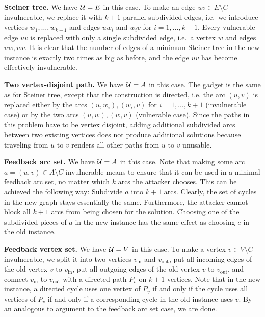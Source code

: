 \textbf{Steiner tree.} We have $\mathcal{U} = E$ in this case.
To make an edge $uv \in E \setminus C$ invulnerable, we replace it with $k+1$ parallel subdivided edges, i.e.\ we introduce vertices $w_1, \dots, w_{k+1}$ and edges $uw_i$ and $w_iv$ for $i =1,\dots, k+1$.
Every vulnerable edge $uv$ is replaced with only a single subdivided edge, i.e.\ a vertex $w$ and edges $uw, wv$.
It is clear that the number of edges of a minimum Steiner tree in the new instance is exactly two times as big as before, and the edge $uv$ has become effectively invulnerable.  

\textbf{Two vertex-disjoint path.}
We have $\mathcal{U} = A$ in this case.
The gadget is the same as for Steiner tree, except that the construction is directed, i.e. the arc $(u,v)$ is replaced either by the arcs $(u,w_i), (w_i, v)$ for $i=1,\dots,k+1$ (invulnerable case) or by the two arcs $(u,w), (w,v)$ (vulnerable case).
Since the paths in this problem have to be vertex disjoint, adding additional subdivided arcs between two existing vertices does not produce additional solutions because traveling from $u$ to $v$ renders all other paths from $u$ to $v$ unusable.

\textbf{Feedback arc set.} We have $\mathcal{U} = A$ in this case. 
Note that making some arc $a = (u,v) \in A \setminus C$ invulnerable means to ensure that it can be used in a minimal feedback arc set, no matter which $k$ arcs the attacker chooses.
This can be achieved the following way: Subdivide $a$ into $k + 1$ arcs. 
Clearly, the set of cycles in the new graph stays essentially the same. 
Furthermore, the attacker cannot block all $k + 1$ arcs from being chosen for the solution.
Choosing one of the subdivided pieces of $a$ in the new instance has the same effect as choosing $e$ in the old instance.

\textbf{Feedback vertex set.}
We have $\mathcal{U} = V$ in this case.
To make a vertex $v \in V \setminus C$ invulnerable, we split it into two vertices $v_\text{in}$ and $v_\text{out}$, 
put all incoming edges of the old vertex $v$ to $v_\text{in}$, 
put all outgoing edges of the old vertex $v$ to $v_\text{out}$,
and connect $v_\text{in}$ to $v_\text{out}$ with a directed path $P_v$ on $k+1$ vertices.
Note that in the new instance, a directed cycle uses one vertex of $P_v$ if and only if the cycle uses all vertices of $P_v$ if and only if a corresponding cycle in the old instance uses $v$.
By an analogous to argument to the feedback arc set case, we are done.

